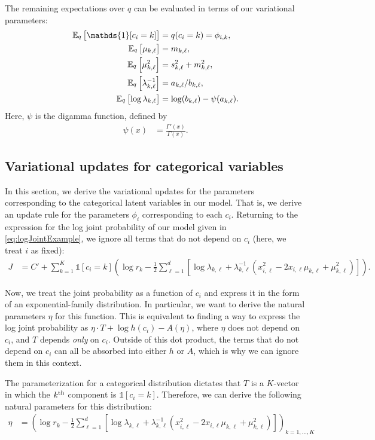 \documentclass[11pt]{article}
\begin{document}
The remaining expectations over $q$ can be evaluated in terms of our variational parameters:
\begin{align}
\expectOver{q}{\mathds{1}[c_i=k]}
&= q(c_i = k) = \phi_{i,k}, \\
\expectOver{q}{\mu_{k,\ell}}
&= m_{k,\ell}, \\
\expectOver{q}{\mu_{k,\ell}^2}
&= s_{k,\ell}^2 + m_{k,\ell}^2, \\
\expectOver{q}{\lambda_{k,\ell}^{-1}}
&= a_{k,\ell} / b_{k,\ell}, \\
\expectOver{q}{\log \lambda_{k,\ell}}
&= \log(b_{k,\ell}) - \psi(a_{k,\ell}).
\end{align}
Here, $\psi$ is the digamma function, defined by
\begin{align}
\psi(x) &= \frac{\Gamma'(x)}{\Gamma(x)}.
\end{align}

\subsection{Variational updates for categorical variables}

In this section, we derive the variational updates for the parameters corresponding to the categorical latent variables in our model.
That is, we derive an update rule for the parameters $\phi_i$ corresponding to each $c_i$.
Returning to the expression for the log joint probability of our model given in \eqref{eq:logJointExample}, we ignore all terms that do not depend on $c_i$ (here, we treat $i$ as fixed):
\begin{align}
J
&= C' + \sum_{k=1}^K \mathds{1}[c_i = k] \left( \log r_k - \frac{1}{2}
        \sum_{\ell=1}^d \left[ \log \lambda_{k,\ell} + \lambda_{k,\ell}^{-1} \left( x_{i,\ell}^2 - 2 x_{i,\ell} \mu_{k,\ell} + \mu_{k,\ell}^2 \right) \right]
    \right).
\end{align}

Now, we treat the joint probability as a function of $c_i$ and express it in the form of an exponential-family distribution.
In particular, we want to derive the natural parameters $\eta$ for this function.
This is equivalent to finding a way to express the log joint probability as $\eta \cdot T + \log h(c_i) - A(\eta)$, where $\eta$ does not depend on $c_i$, and $T$ depends \emph{only} on $c_i$.
Outside of this dot product, the terms that do not depend on $c_i$ can all be absorbed into either $h$ or $A$, which is why we can ignore them in this context.

The parameterization for a categorical distribution dictates that $T$ is a $K$-vector in which the $k^{\mathrm{th}}$ component is $\mathds{1}[c_i = k]$.
Therefore, we can derive the following natural parameters for this distribution:
\begin{align}
\eta &= \left(
    \log r_k - \frac{1}{2} \sum_{\ell=1}^d \left[ \log \lambda_{k,\ell} + \lambda_{k,\ell}^{-1} \left( x_{i,\ell}^2 - 2 x_{i,\ell} \mu_{k,\ell} + \mu_{k,\ell}^2 \right) \right]
\right)_{k = 1, \ldots, K}
\end{align}
\end{document}
